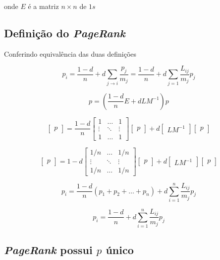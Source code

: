 \documentclass[
  letterpaper,
  DIV=11,
  numbers=noendperiod]{scrartcl}
\begin{document}
onde \(E\) é a matriz \(n\times n\) de \(1s\)

\hypertarget{definiuxe7uxe3o-do-pagerank}{%
\subsection{\texorpdfstring{Definição do
\emph{PageRank}}{Definição do PageRank}}\label{definiuxe7uxe3o-do-pagerank}}

Conferindo equivalência das duas definições

\[ p_i = \frac{1-d}{n} + d\sum_{j\rightarrow i} \frac{p_j}{m_j} = \frac{1-d}{n} + d\sum_{j=1}\frac{L_{ij}}{m_j}p_j\]

\[ p = \left(\frac{1-d}{n}E + dLM^{-1}\right)p\]

\[ \begin{bmatrix}p\end{bmatrix} = \frac{1-d}{n}\begin{bmatrix}1&\ldots&1\\\vdots&\ddots&\vdots\\1&\ldots&1\end{bmatrix}\begin{bmatrix}p\end{bmatrix} + d\begin{bmatrix}LM^{-1}\end{bmatrix}\begin{bmatrix}p\end{bmatrix}\]

\[ \begin{bmatrix}p\end{bmatrix} = 1-d\begin{bmatrix}1/n&\ldots&1/n\\\vdots&\ddots&\vdots\\1/n&\ldots&1/n\end{bmatrix}\begin{bmatrix}p\end{bmatrix} + d\begin{bmatrix}LM^{-1}\end{bmatrix}\begin{bmatrix}p\end{bmatrix}\]

\[p_i = \frac{1-d}{n}(p_1+p_2+\dots+p_n) + d \sum_{i=1}^n \frac{L_{ij}}{m_j}p_j\]

\[p_i = \frac{1-d}{n} + d \sum_{i=1}^n \frac{L_{ij}}{m_j}p_j\]

\hypertarget{pagerank-possui-p-uxfanico}{%
\subsection{\texorpdfstring{\emph{PageRank} possui \(p\)
único}{PageRank possui p único}}\label{pagerank-possui-p-uxfanico}}
\end{document}
